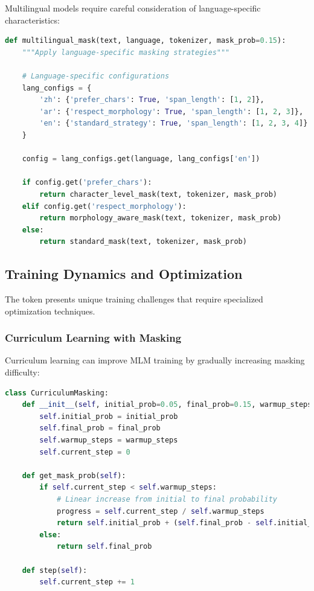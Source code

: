 Multilingual models require careful consideration of language-specific characteristics:

\begin{lstlisting}[language=Python, caption=Language-aware masking]
def multilingual_mask(text, language, tokenizer, mask_prob=0.15):
    """Apply language-specific masking strategies"""
    
    # Language-specific configurations
    lang_configs = {
        'zh': {'prefer_chars': True, 'span_length': [1, 2]},
        'ar': {'respect_morphology': True, 'span_length': [1, 2, 3]},
        'en': {'standard_strategy': True, 'span_length': [1, 2, 3, 4]}
    }
    
    config = lang_configs.get(language, lang_configs['en'])
    
    if config.get('prefer_chars'):
        return character_level_mask(text, tokenizer, mask_prob)
    elif config.get('respect_morphology'):
        return morphology_aware_mask(text, tokenizer, mask_prob)
    else:
        return standard_mask(text, tokenizer, mask_prob)
\end{lstlisting}

\subsection{Training Dynamics and Optimization}

The \mask{} token presents unique training challenges that require specialized optimization techniques.

\subsubsection{Curriculum Learning with Masking}

Curriculum learning can improve MLM training by gradually increasing masking difficulty:

\begin{lstlisting}[language=Python, caption=Curriculum masking]
class CurriculumMasking:
    def __init__(self, initial_prob=0.05, final_prob=0.15, warmup_steps=10000):
        self.initial_prob = initial_prob
        self.final_prob = final_prob
        self.warmup_steps = warmup_steps
        self.current_step = 0
    
    def get_mask_prob(self):
        if self.current_step < self.warmup_steps:
            # Linear increase from initial to final probability
            progress = self.current_step / self.warmup_steps
            return self.initial_prob + (self.final_prob - self.initial_prob) * progress
        else:
            return self.final_prob
    
    def step(self):
        self.current_step += 1
\end{lstlisting}

